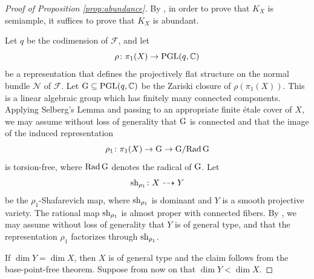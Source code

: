 \documentclass[english,10pt]{amsart}
\newcommand{\cF}{\mathcal{F}}
\newcommand{\sN}{\mathscr{N}}
\theoremstyle{definition}
\theoremstyle{remark}
\numberwithin{equation}{section}
\begin{document}
\begin{proof}[Proof of Proposition \ref{prop:abundance}]
By \cite[Proposition 2.1]{kawamata}, in order to prove that $K_X$ is semiample, it suffices to prove that $K_X$ is abundant. 

Let $q$ be the codimension of $\cF$, and let
\[
\rho\colon \pi_1(X) \to \textup{PGL}(q,\mathbb{C})
\]
be a representation that defines the projectively flat structure on the normal bundle $\sN$ of $\cF$. Let $\textup{G} \subseteq \textup{PGL}(q,\mathbb{C})$ be the Zariski closure of $\rho(\pi_1(X))$. This is a linear algebraic group which has finitely many connected components. Applying Selberg's Lemma and passing to an appropriate finite \'etale cover of $X$, we may assume without loss of generality that $\textup{G}$ is connected and that the image of the induced representation
\[
\rho_1 \colon \pi_1(X) \to \textup{G} \to \textup{G}/\textup{Rad}\,\textup{G}
\]
is torsion-free, where $\textup{Rad}\,\textup{G}$ denotes the radical of $\textup{G}$. Let 
\[
\textup{sh}_{\rho_1}\colon X \dashrightarrow Y
\]
be the $\rho_1$-Shafarevich map, where $\textup{sh}_{\rho_1}$ is dominant and
$Y$ is a smooth projective variety. The rational map $\textup{sh}_{\rho_1}$ is almost proper with connected fibers. By \cite[Th\'eor\`eme 1]{CCE15}, we may assume without loss of generality that $Y$ is of general type, and that the representation $\rho_1$ factorizes through $\textup{sh}_{\rho_1}$. 

If $\dim Y = \dim X$, then $X$ is of general type and the claim follows from the base-point-free theorem. Suppose from now on that $\dim Y < \dim X$.


\end{proof}
\end{document}
